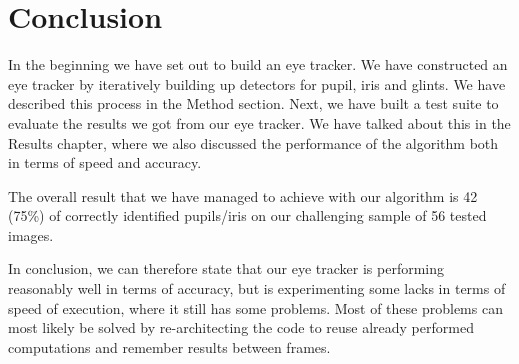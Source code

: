 \section{Conclusion}
In the beginning we have set out to build an eye tracker. We have constructed an eye tracker by iteratively building up detectors for pupil, iris and glints. We have described this process in the Method section. Next, we have built a test suite to evaluate the results we got from our eye tracker. We have talked about this in the Results chapter, where we also discussed the performance of the algorithm both in terms of speed and accuracy.

The overall result that we have managed to achieve with our algorithm is 42 (75\%) of correctly identified pupils/iris on our challenging sample of 56 tested images.

In conclusion, we can therefore state that our eye tracker is performing reasonably well in terms of accuracy, but is experimenting some lacks in terms of speed of execution, where it still has some problems. Most of these problems can most likely be solved by re-architecting the code to reuse already performed computations and remember results between frames.